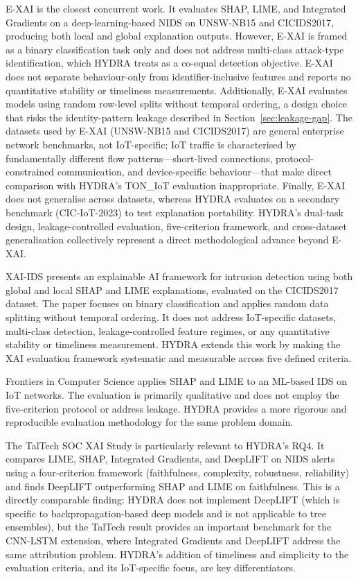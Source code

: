 \documentclass[12pt,a4paper]{report}
\begin{document}
E-XAI \citep{islam2024} is the closest concurrent work. It evaluates SHAP, LIME, and Integrated Gradients on a deep-learning-based NIDS on UNSW-NB15 and CICIDS2017, producing both local and global explanation outputs. However, E-XAI is framed as a binary classification task only and does not address multi-class attack-type identification, which HYDRA treats as a co-equal detection objective. E-XAI does not separate behaviour-only from identifier-inclusive features and reports no quantitative stability or timeliness measurements. Additionally, E-XAI evaluates models using random row-level splits without temporal ordering, a design choice that risks the identity-pattern leakage described in Section~\ref{sec:leakage-gap}. The datasets used by E-XAI (UNSW-NB15 and CICIDS2017) are general enterprise network benchmarks, not IoT-specific; IoT traffic is characterised by fundamentally different flow patterns---short-lived connections, protocol-constrained communication, and device-specific behaviour---that make direct comparison with HYDRA's TON\_IoT evaluation inappropriate. Finally, E-XAI does not generalise across datasets, whereas HYDRA evaluates on a secondary benchmark (CIC-IoT-2023) to test explanation portability. HYDRA's dual-task design, leakage-controlled evaluation, five-criterion framework, and cross-dataset generalisation collectively represent a direct methodological advance beyond E-XAI.

XAI-IDS \citep{srivastava2024} presents an explainable AI framework for intrusion detection using both global and local SHAP and LIME explanations, evaluated on the CICIDS2017 dataset. The paper focuses on binary classification and applies random data splitting without temporal ordering. It does not address IoT-specific datasets, multi-class detection, leakage-controlled feature regimes, or any quantitative stability or timeliness measurement. HYDRA extends this work by making the XAI evaluation framework systematic and measurable across five defined criteria.

Frontiers in Computer Science \citep{bhattP2025} applies SHAP and LIME to an ML-based IDS on IoT networks. The evaluation is primarily qualitative and does not employ the five-criterion protocol or address leakage. HYDRA provides a more rigorous and reproducible evaluation methodology for the same problem domain.

The TalTech SOC XAI Study \citep{viirlaid2025} is particularly relevant to HYDRA's RQ4. It compares LIME, SHAP, Integrated Gradients, and DeepLIFT on NIDS alerts using a four-criterion framework (faithfulness, complexity, robustness, reliability) and finds DeepLIFT outperforming SHAP and LIME on faithfulness. This is a directly comparable finding: HYDRA does not implement DeepLIFT (which is specific to backpropagation-based deep models and is not applicable to tree ensembles), but the TalTech result provides an important benchmark for the CNN-LSTM extension, where Integrated Gradients and DeepLIFT address the same attribution problem. HYDRA's addition of timeliness and simplicity to the evaluation criteria, and its IoT-specific focus, are key differentiators.
\end{document}
